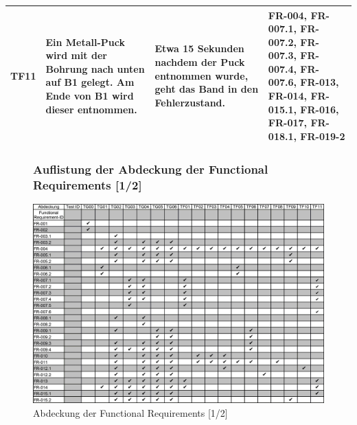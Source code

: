 \documentclass[oneside,a4paper,titlepage]{scrartcl}              %
\begin{document}
\begin{small}
\begin{center}
\begin{longtable}{|c|p{4cm}|p{6cm}|C{3cm}|}
      \hline
      TF11 & Ein Metall-Puck wird mit der Bohrung nach unten auf B1 gelegt. Am Ende von B1 wird dieser entnommen. & Etwa 15 Sekunden nachdem der Puck entnommen wurde, geht das Band in den Fehlerzustand. & FR-004, FR-007.1, FR-007.2, FR-007.3, FR-007.4, FR-007.6, FR-013, FR-014, FR-015.1, FR-016, FR-017, FR-018.1, FR-019-2\\
      \hline
    \end{longtable}
  \end{center}
\end{small}

\begin{figure}[p]
  \subsubsection{Auflistung der Abdeckung der Functional Requirements [1/2]}
  \centering\includegraphics[angle=90,scale=0.305]{imgs/Req_Test_Abdeckung_1.png}
  \caption{Abdeckung der Functional Requirements [1/2]}
\end{figure}
\end{document}
